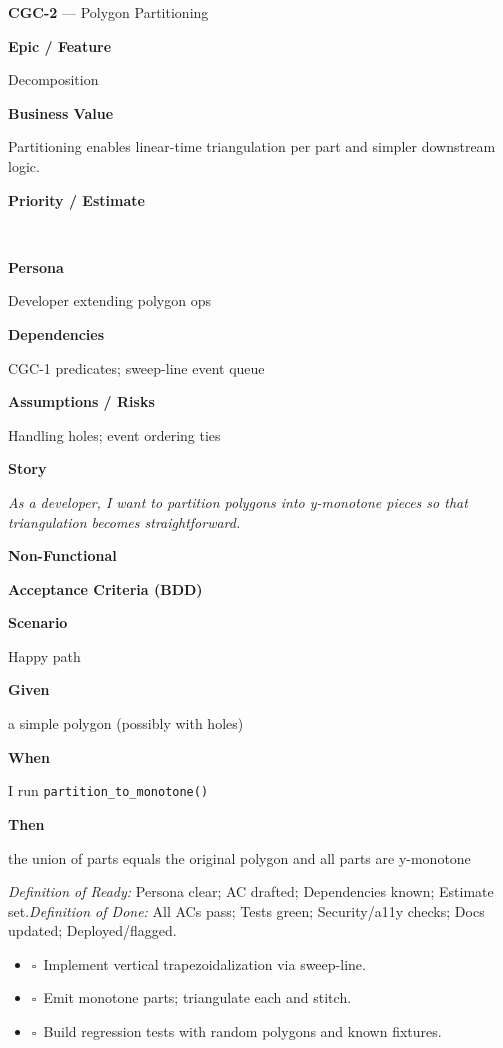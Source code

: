 \documentclass[11pt,a4paper]{article}
\newcommand{\MetaRow}[2]{%
  \noindent\begin{minipage}[t]{0.24\linewidth}\raggedleft\bfseries #1\end{minipage}%
  \hspace{0.8em}%
  \begin{minipage}[t]{0.72\linewidth}\raggedright #2\end{minipage}\par\vspace{0.3em}}
\newcommand{\CBox}{\(\square\)}
\newcommand{\BDDRow}[2]{\MetaRow{#1}{#2}}
\newenvironment{BDD}{\par\medskip}{\par\medskip}
\newcommand{\StoryTitle}[2]{\textbf{#1} --- #2}
\newcommand{\DoR}{\textit{Definition of Ready:} Persona clear; AC drafted; Dependencies known; Estimate set.}
\newcommand{\DoD}{\textit{Definition of Done:} All ACs pass; Tests green; Security/a11y checks; Docs updated; Deployed/flagged.}
\begin{document}
\clearpage

\begin{StoryCard}{\StoryTitle{CGC-2}{Polygon Partitioning}}
\MetaRow{Epic / Feature}{Decomposition}
\MetaRow{Business Value}{Partitioning enables linear-time triangulation per part and simpler downstream logic.}
\MetaRow{Priority / Estimate}{\ \ \Badge{SP: 3}}
\MetaRow{Persona}{Developer extending polygon ops}
\MetaRow{Dependencies}{CGC-1 predicates; sweep-line event queue}
\MetaRow{Assumptions / Risks}{Handling holes; event ordering ties}
\MetaRow{Story}{\emph{As a developer, I want to partition polygons into y-monotone pieces so that triangulation becomes straightforward.}}

\medskip
\noindent\textbf{Non-Functional}\quad
{}\ \ 

\medskip
\noindent\textbf{Acceptance Criteria (BDD)}
\begin{BDD}
\BDDRow{Scenario}{Happy path}
\BDDRow{Given}{a simple polygon (possibly with holes)}
\BDDRow{When}{I run \texttt{partition\_to\_monotone()}}
\BDDRow{Then}{the union of parts equals the original polygon and all parts are y-monotone}
\end{BDD}

\medskip
{\footnotesize \DoR\quad\textbullet\quad \DoD}
\end{StoryCard}

\begin{TaskBox}
\begin{itemize}
  \item \CBox\ Implement vertical trapezoidalization via sweep-line.
  \item \CBox\ Emit monotone parts; triangulate each and stitch.
  \item \CBox\ Build regression tests with random polygons and known fixtures.
\end{itemize}
\end{TaskBox}

\clearpage
\end{document}
